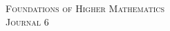 \documentclass{article}
\begin{document}

\begin{center}
\textsc{\Large Foundations of Higher Mathematics}\\[.3cm]
\textsc{\Large Journal 6}\\[1cm]
\end{center}

\end{document}
